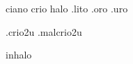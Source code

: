 % 
%

\begin{prefixos}
ciano crio halo .lito
.oro .uro
\end{prefixos}

.crio2u .malcrio2u
\begin{3a_ppi}
inhalo
\end{3a_ppi}
\endinput